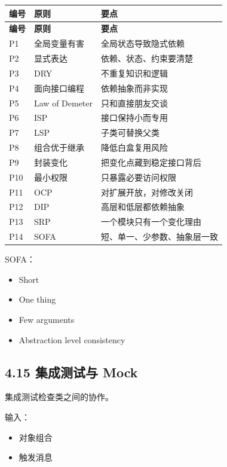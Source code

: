 \documentclass[UTF8,zihao=-4]{ctexart}
\begin{document}
\begin{longtable}{|>{\raggedright\arraybackslash}p{}|>{\raggedright\arraybackslash}p{}|>{\raggedright\arraybackslash}p{}|}
\hline
\textbf{编号} & \textbf{原则} & \textbf{要点} \\
\hline
\endfirsthead
\hline
\textbf{编号} & \textbf{原则} & \textbf{要点} \\
\hline
\endhead
P1 & 全局变量有害 & 全局状态导致隐式依赖 \\
\hline
P2 & 显式表达 & 依赖、状态、约束要清楚 \\
\hline
P3 & DRY & 不重复知识和逻辑 \\
\hline
P4 & 面向接口编程 & 依赖抽象而非实现 \\
\hline
P5 & Law of Demeter & 只和直接朋友交谈 \\
\hline
P6 & ISP & 接口保持小而专用 \\
\hline
P7 & LSP & 子类可替换父类 \\
\hline
P8 & 组合优于继承 & 降低白盒复用风险 \\
\hline
P9 & 封装变化 & 把变化点藏到稳定接口背后 \\
\hline
P10 & 最小权限 & 只暴露必要访问权限 \\
\hline
P11 & OCP & 对扩展开放，对修改关闭 \\
\hline
P12 & DIP & 高层和低层都依赖抽象 \\
\hline
P13 & SRP & 一个模块只有一个变化理由 \\
\hline
P14 & SOFA & 短、单一、少参数、抽象层一致 \\
\hline
\end{longtable}

SOFA：

\begin{itemize}
\item Short
\item One thing
\item Few arguments
\item Abstraction level consistency
\end{itemize}

\subsection{4.15 集成测试与 Mock}

集成测试检查类之间的协作。

输入：

\begin{itemize}
\item 对象组合
\item 触发消息
\end{itemize}
\end{document}
